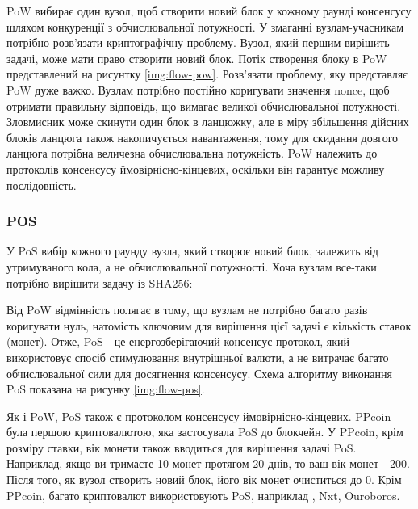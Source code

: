 \documentclass{lib/styles/default-style}
\begin{document}
    PoW вибирає один вузол, щоб створити новий блок у кожному раунді консенсусу шляхом конкуренції з
    обчислювальної потужності. У змаганні вузлам-учасникам потрібно розв'язати криптографічну проблему.
    Вузол, який першим вирішить задачі, може мати право створити новий блок.
    Потік створення блоку в PoW представлений на рисунтку \ref{img:flow-pow}.
    Розв'язати проблему, яку представляє PoW дуже важко.
    Вузлам потрібно постійно коригувати значення nonce, щоб отримати правильну відповідь,
    що вимагає великої обчислювальної потужності.
    Зловмисник може скинути один блок в ланцюжку, але в міру збільшення дійсних блоків ланцюга
    також накопичується навантаження, тому для скидання довгого ланцюга потрібна величезна обчислювальна потужність.
    PoW належить до протоколів консенсусу ймовірнісно-кінцевих, оскільки він гарантує можливу послідовність.


    \subsubsection{POS}

    У PoS вибір кожного раунду вузла, який створює новий блок, залежить від утримуваного кола, а не обчислювальної потужності.
    Хоча вузлам все-таки потрібно вирішити задачу із SHA256:



    Від PoW відмінність полягає в тому, що вузлам не потрібно багато разів коригувати нуль,
    натомість ключовим для вирішення цієї задачі є кількість ставок (монет).
    Отже, PoS - це енергозберігаючий консенсус-протокол, який використовує спосіб стимулювання внутрішньої валюти,
    а не витрачає багато обчислювальної сили для досягнення консенсусу.
    Схема алгоритму виконання PoS показана на рисунку \ref{img:flow-pos}.

    Як і PoW, PoS також є протоколом консенсусу ймовірнісно-кінцевих.
    PPcoin була першою криптовалютою, яка застосувала PoS до блокчейн.
    У PPcoin, крім розміру ставки, вік монети також вводиться для вирішення задачі PoS.
    Наприклад, якщо ви тримаєте 10 монет протягом 20 днів, то ваш вік монет - 200.
    Після того, як вузол створить новий блок, його вік монет очиститься до 0.
    Крім PPcoin, багато криптовалют використовують PoS, наприклад , Nxt, Ouroboros.
      
\end{document}
